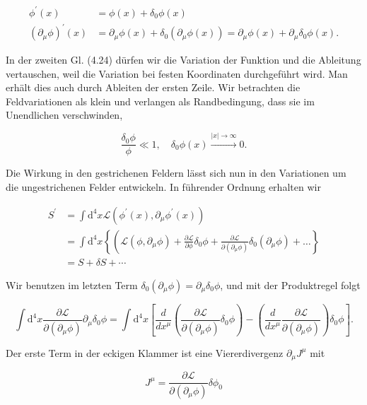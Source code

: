 \documentclass[10pt, letterpaper]{article}
\begin{document}
$$
\begin{aligned}
\phi^{\prime}(x) & =\phi(x)+\delta_{0} \phi(x) \\
\left(\partial_{\mu} \phi\right)^{\prime}(x) & =\partial_{\mu} \phi(x)+\delta_{0}\left(\partial_{\mu} \phi(x)\right)=\partial_{\mu} \phi(x)+\partial_{\mu} \delta_{0} \phi(x) .
\end{aligned}
$$

In der zweiten Gl. (4.24) dürfen wir die Variation der Funktion und die Ableitung vertauschen, weil die Variation bei festen Koordinaten durchgeführt wird. Man erhält dies auch durch Ableiten der ersten Zeile. Wir betrachten die Feldvariationen als klein und verlangen als Randbedingung, dass sie im Unendlichen verschwinden,

$$
\frac{\delta_{0} \phi}{\phi} \ll 1, \quad \delta_{0} \phi(x) \xrightarrow{|x| \rightarrow \infty} 0 .
$$

Die Wirkung in den gestrichenen Feldern lässt sich nun in den Variationen um die ungestrichenen Felder entwickeln. In führender Ordnung erhalten wir

$$
\begin{aligned}
S^{\prime} & =\int \mathrm{d}^{4} x \mathscr{L}\left(\phi^{\prime}(x), \partial_{\mu} \phi^{\prime}(x)\right) \\
& =\int \mathrm{d}^{4} x\left\{\left(\mathscr{L}\left(\phi, \partial_{\mu} \phi\right)+\frac{\partial \mathscr{L}}{\partial \phi} \delta_{0} \phi+\frac{\partial \mathscr{L}}{\partial\left(\partial_{\mu} \phi\right)} \delta_{0}\left(\partial_{\mu} \phi\right)+\ldots\right\}\right. \\
& =S+\delta S+\cdots
\end{aligned}
$$

Wir benutzen im letzten Term $\delta_{0}\left(\partial_{\mu} \phi\right)=\partial_{\mu} \delta_{0} \phi$, und mit der Produktregel folgt

$$
\int \mathrm{d}^{4} x \frac{\partial \mathscr{L}}{\partial\left(\partial_{\mu} \phi\right)} \partial_{\mu} \delta_{0} \phi=\int \mathrm{d}^{4} x\left[\frac{d}{d x^{\mu}}\left(\frac{\partial \mathscr{L}}{\partial\left(\partial_{\mu} \phi\right)} \delta_{0} \phi\right)-\left(\frac{d}{d x^{\mu}} \frac{\partial \mathscr{L}}{\partial\left(\partial_{\mu} \phi\right)}\right) \delta_{0} \phi\right] .
$$

Der erste Term in der eckigen Klammer ist eine Viererdivergenz $\partial_{\mu} J^{\mu}$ mit

$$
J^{\mu}=\frac{\partial \mathscr{L}}{\partial\left(\partial_{\mu} \phi\right)} \delta \phi_{0}
$$
\end{document}
